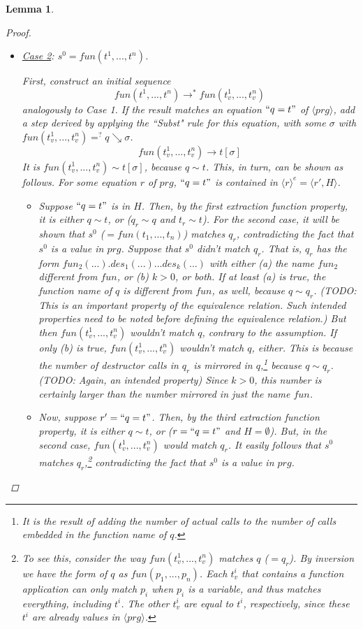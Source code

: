 \documentclass[11pt]{article} %
\newtheorem{lemma}{Lemma}
\begin{document}
\begin{lemma}
\begin{proof}
\begin{itemize}
\item \underline{Case 2}: $s^0 = fun(t^1, ..., t^n)$.

First, construct an initial sequence
\begin{equation*}
fun(t^1, ..., t^n) \longrightarrow^* fun(t^1_v, ..., t^n_v)
\end{equation*}
analogously to Case 1. If the result matches an equation $`` q = t "$ of $\langle prg \rangle$, add a step derived by applying the ``Subst" rule for this equation, with some $\sigma$ with $fun(t^1_v, ..., t^n_v) =^? q \searrow \sigma$.
\begin{equation*}
fun(t^1_v, ..., t^n_v) \longrightarrow t[\sigma]
\end{equation*}
It is $fun(t^1_v, ..., t^n_v) \sim t[\sigma]$, because $q \sim t$. This, in turn, can be shown as follows. For some equation $r$ of $prg$, $`` q = t "$ is contained in $\langle r \rangle^e = \big\langle r', H \big\rangle$.

\begin{itemize}
\item Suppose $`` q = t "$ is in $H$. Then, by the first extraction function property, it is either $q \sim t$, or ($q_r \sim q$ and $t_r \sim t$). For the second case, it will be shown that $s^0$ ($= fun(t_1, ..., t_n)$) matches $q_r$, contradicting the fact that $s^0$ is a value in $prg$. Suppose that $s^0$ didn't match $q_r$. That is, $q_r$ has the form $fun_2(...).des_1(...)...des_k(...)$ with either (a) the name $fun_2$ different from $fun$, or (b) $k > 0$, or both. If at least (a) is true, the function name of $q$ is different from $fun$, as well, because $q \sim q_r$. (TODO: This is an important property of the equivalence relation. Such intended properties need to be noted before defining the equivalence relation.) But then $fun(t^1_v, ..., t^n_v)$ wouldn't match $q$, contrary to the assumption. If only (b) is true, $fun(t^1_v, ..., t^n_v)$ wouldn't match $q$, either. This is because the number of destructor calls in $q_r$ is mirrored in $q$,\footnote{It is the result of adding the number of actual calls to the number of calls embedded in the function name of $q$.} because $q \sim q_r$. (TODO: Again, an intended property) Since $k > 0$, this number is certainly larger than the number mirrored in just the name $fun$.

\item Now, suppose $r' = `` q = t "$. Then, by the third extraction function property, it is either $q \sim t$, or ($r = `` q = t "$ and $H = \emptyset$). But, in the second case, $fun(t^1_v, ..., t^n_v)$ would match $q_r$. It easily follows that $s^0$ matches $q_r$,\footnote{To see this, consider the way $fun(t^1_v, ..., t^n_v)$ matches $q$ ($= q_r$). By inversion we have the form of $q$ as $fun(p_1, ..., p_n)$. Each $t^i_v$ that contains a function application can only match $p_i$ when $p_i$ is a variable, and thus matches everything, including $t^i$. The other $t^i_v$ are equal to $t^i$, respectively, since these $t^i$ are already values in $\langle prg \rangle$.} contradicting the fact that $s^0$ is a value in $prg$.
\end{itemize}


\end{itemize}
\end{proof}
\end{lemma}
\end{document}
